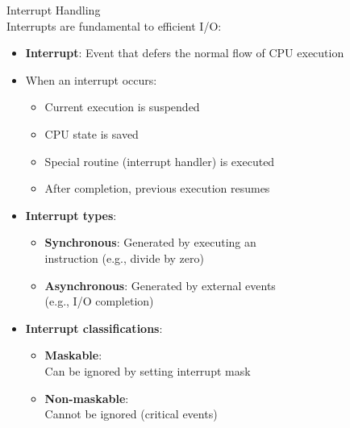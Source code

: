 \begin{definition}{Interrupt Handling}\\
    Interrupts are fundamental to efficient I/O:
    \begin{itemize}
        \item \textbf{Interrupt}: Event that defers the normal flow of CPU execution
        \item When an interrupt occurs:
            \begin{itemize}
                \item Current execution is suspended
                \item CPU state is saved
                \item Special routine (interrupt handler) is executed
                \item After completion, previous execution resumes
            \end{itemize}
        \item \textbf{Interrupt types}:
            \begin{itemize}
                \item \textbf{Synchronous}: Generated by executing an \\ instruction (e.g., divide by zero)
                \item \textbf{Asynchronous}: Generated by external events \\ (e.g., I/O completion)
            \end{itemize}
        \item \textbf{Interrupt classifications}:
            \begin{itemize}
                \item \textbf{Maskable}: \\ Can be ignored by setting interrupt mask
                \item \textbf{Non-maskable}: \\ Cannot be ignored (critical events)
            \end{itemize}
    \end{itemize}
\end{definition}

